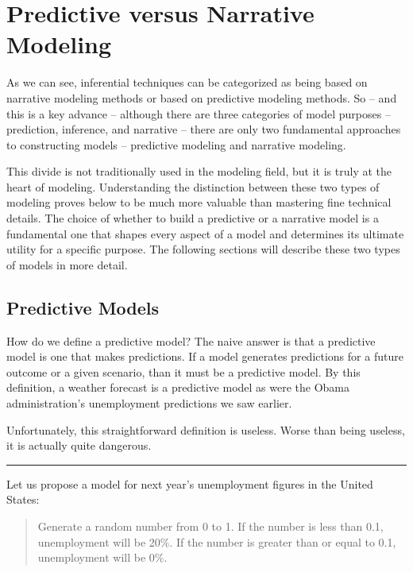 \documentclass[]{memoir}
\begin{document}
\section{Predictive versus Narrative Modeling}

As we can see, inferential techniques can be categorized as being based
on narrative modeling methods or based on predictive modeling methods.
So -- and this is a key advance -- although there are three categories
of model purposes -- prediction, inference, and narrative -- there are
only two fundamental approaches to constructing models -- predictive
modeling and narrative modeling.

This divide is not traditionally used in the modeling field, but it is
truly at the heart of modeling. Understanding the distinction between
these two types of modeling proves below to be much more valuable than
mastering fine technical details. The choice of whether to build a
predictive or a narrative model is a fundamental one that shapes every
aspect of a model and determines its ultimate utility for a specific
purpose. The following sections will describe these two types of models
in more detail.

\subsection{Predictive Models}

How do we define a predictive model? The naive answer is that a
predictive model is one that makes predictions. If a model generates
predictions for a future outcome or a given scenario, than it must be a
predictive model. By this definition, a weather forecast is a predictive
model as were the Obama administration's unemployment predictions we saw
earlier.

Unfortunately, this straightforward definition is useless. Worse than
being useless, it is actually quite dangerous.

\begin{center}\rule{3in}{0.4pt}\end{center}

Let us propose a model for next year's unemployment figures in the
United States:

\begin{quote}
Generate a random number from 0 to 1. If the number is less than 0.1,
unemployment will be 20\%. If the number is greater than or equal to
0.1, unemployment will be 0\%.
\end{quote}
\end{document}
